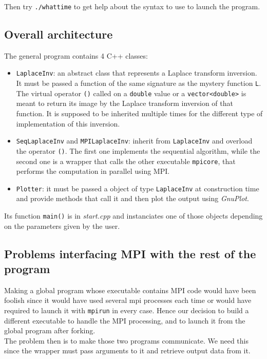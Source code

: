 \documentclass[11pt,a4paper]{article}
\begin{document}
Then try \verb_./whattime_ to get help about the syntax to use to launch the program.

\subsection{Overall architecture}

The general program contains 4 C++ classes:
\begin{itemize}
  \item \verb_LaplaceInv_: an abstract class that represents a Laplace transform inversion. It must be passed a function of the same signature as the mystery function \verb_L_. The virtual operator \verb_()_ called on a \verb_double_ value or a \verb_vector<double>_ is meant to return its image by the Laplace transform inversion of that function. It is supposed to be inherited multiple times for the different type of implementation of this inversion.
  \item \verb_SeqLaplaceInv_ and \verb_MPILaplaceInv_: inherit from \verb_LaplaceInv_ and overload the operator \verb_()_. The first one implements the sequential algorithm, while the second one is a wrapper that calls the other executable \verb_mpicore_, that performs the computation in parallel using MPI.
  \item \verb_Plotter_: it must be passed a object of type \verb_LaplaceInv_ at construction time and provide methods that call it and then plot the output using \textit{GnuPlot}.
\end{itemize}
Its function \verb_main()_ is in \textit{start.cpp} and instanciates one of those objects depending on the parameters given by the user.

\subsection{Problems interfacing MPI with the rest of the program}
Making a global program whose executable contains MPI code would have been foolish since it would have used several mpi processes each time or would have required to launch it with \verb_mpirun_ in every case. Hence our decision to build a different executable to handle the MPI processing, and to launch it from the global program after forking.\\

The problem then is to make those two programs communicate. We need this since the wrapper must pass arguments to it and retrieve output data from it.\\
\end{document}
